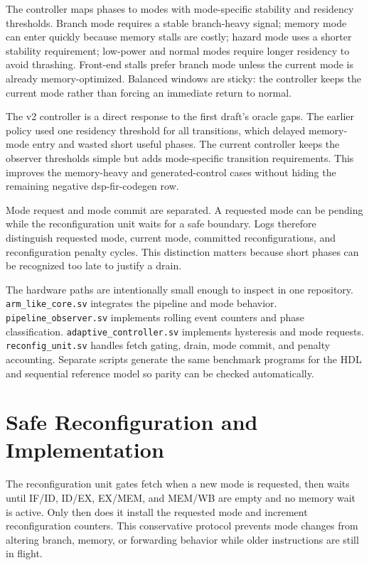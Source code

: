 \documentclass[conference]{IEEEtran}
\begin{document}
The controller maps phases to modes with mode-specific stability and residency thresholds. Branch mode requires a stable branch-heavy signal; memory mode can enter quickly because memory stalls are costly; hazard mode uses a shorter stability requirement; low-power and normal modes require longer residency to avoid thrashing. Front-end stalls prefer branch mode unless the current mode is already memory-optimized. Balanced windows are sticky: the controller keeps the current mode rather than forcing an immediate return to normal.

The v2 controller is a direct response to the first draft's oracle gaps. The earlier policy used one residency threshold for all transitions, which delayed memory-mode entry and wasted short useful phases. The current controller keeps the observer thresholds simple but adds mode-specific transition requirements. This improves the memory-heavy and generated-control cases without hiding the remaining negative dsp-fir-codegen row.

Mode request and mode commit are separated. A requested mode can be pending while the reconfiguration unit waits for a safe boundary. Logs therefore distinguish requested mode, current mode, committed reconfigurations, and reconfiguration penalty cycles. This distinction matters because short phases can be recognized too late to justify a drain.

The hardware paths are intentionally small enough to inspect in one repository. \texttt{arm\_like\_core.sv} integrates the pipeline and mode behavior. \texttt{pipeline\_observer.sv} implements rolling event counters and phase classification. \texttt{adaptive\_controller.sv} implements hysteresis and mode requests. \texttt{reconfig\_unit.sv} handles fetch gating, drain, mode commit, and penalty accounting. Separate scripts generate the same benchmark programs for the HDL and sequential reference model so parity can be checked automatically.

\section{Safe Reconfiguration and Implementation}

The reconfiguration unit gates fetch when a new mode is requested, then waits until IF/ID, ID/EX, EX/MEM, and MEM/WB are empty and no memory wait is active. Only then does it install the requested mode and increment reconfiguration counters. This conservative protocol prevents mode changes from altering branch, memory, or forwarding behavior while older instructions are still in flight.
\end{document}
